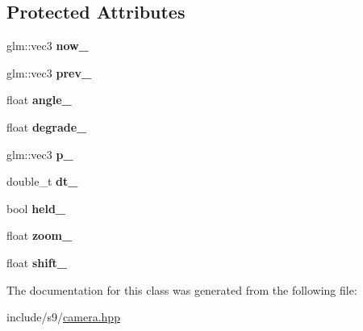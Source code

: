 \subsection*{\-Protected \-Attributes}
\begin{DoxyCompactItemize}
\item 
\hypertarget{classs9_1_1InertiaCam_a64fd764e8f91e0545c21bd7bfeebd23c}{glm\-::vec3 {\bfseries now\-\_\-}}\label{classs9_1_1InertiaCam_a64fd764e8f91e0545c21bd7bfeebd23c}

\item 
\hypertarget{classs9_1_1InertiaCam_a5096a8120888426c6ce2bf1d256b644c}{glm\-::vec3 {\bfseries prev\-\_\-}}\label{classs9_1_1InertiaCam_a5096a8120888426c6ce2bf1d256b644c}

\item 
\hypertarget{classs9_1_1InertiaCam_a7a1a89dd5723ceea7df32cc9c64e3225}{float {\bfseries angle\-\_\-}}\label{classs9_1_1InertiaCam_a7a1a89dd5723ceea7df32cc9c64e3225}

\item 
\hypertarget{classs9_1_1InertiaCam_ad461b3ac8f8a4d7859b32cc4c8b3531c}{float {\bfseries degrade\-\_\-}}\label{classs9_1_1InertiaCam_ad461b3ac8f8a4d7859b32cc4c8b3531c}

\item 
\hypertarget{classs9_1_1InertiaCam_a09501b0d8bf3f4489480f2637a672b22}{glm\-::vec3 {\bfseries p\-\_\-}}\label{classs9_1_1InertiaCam_a09501b0d8bf3f4489480f2637a672b22}

\item 
\hypertarget{classs9_1_1InertiaCam_ae699b94a6bd9d71e1e91af54da4e74d2}{double\-\_\-t {\bfseries dt\-\_\-}}\label{classs9_1_1InertiaCam_ae699b94a6bd9d71e1e91af54da4e74d2}

\item 
\hypertarget{classs9_1_1InertiaCam_abe5f832335b7a55da7d90a1dadf70c22}{bool {\bfseries held\-\_\-}}\label{classs9_1_1InertiaCam_abe5f832335b7a55da7d90a1dadf70c22}

\item 
\hypertarget{classs9_1_1InertiaCam_a47c244d385bfc0283bbaa73a637cdb6e}{float {\bfseries zoom\-\_\-}}\label{classs9_1_1InertiaCam_a47c244d385bfc0283bbaa73a637cdb6e}

\item 
\hypertarget{classs9_1_1InertiaCam_a3b3ad7d4caca93e8af230cc25a19040f}{float {\bfseries shift\-\_\-}}\label{classs9_1_1InertiaCam_a3b3ad7d4caca93e8af230cc25a19040f}

\end{DoxyCompactItemize}


\-The documentation for this class was generated from the following file\-:\begin{DoxyCompactItemize}
\item 
include/s9/\hyperlink{camera_8hpp}{camera.\-hpp}\end{DoxyCompactItemize}
